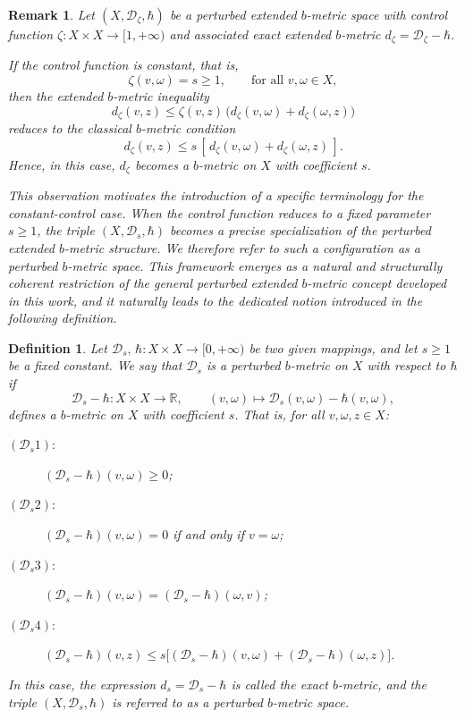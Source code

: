 \documentclass[sn-mathphys-num]{sn-jnl}%
\theoremstyle{thmstyleone}%
\theoremstyle{thmstyletwo}%
\newtheorem{remark}{Remark}%
\theoremstyle{thmstylethree}%
\newtheorem{definition}{Definition}
\numberwithin{equation}{section}
\begin{document}
\vspace{0.2cm}
\begin{remark}
Let $(X,\mathcal{D}_{\zeta},\hbar)$ be a perturbed extended $b$-metric space with 
control function $\zeta : X\times X \to [1,+\infty)$ and associated exact extended 
$b$-metric $d_{\zeta}=\mathcal{D}_{\zeta}-\hbar$.

If the control function is constant, that is,
\[
\zeta(v,\omega)=s\ge 1, \qquad \text{for all } v,\omega\in X,
\]
then the extended $b$-metric inequality
\[
d_{\zeta}(v,z)\le 
\zeta(v,z)\,\big(d_{\zeta}(v,\omega)+d_{\zeta}(\omega,z)\big)
\]
reduces to the classical $b$-metric condition
\[
d_{\zeta}(v,z)\le 
s\,[\,d_{\zeta}(v,\omega)+d_{\zeta}(\omega,z)\,].
\]
Hence, in this case, $d_{\zeta}$ becomes a $b$-metric on $X$ with coefficient $s$.

This observation motivates the introduction of a specific terminology for the 
constant-control case. When the control function reduces to a fixed parameter 
$s\ge 1$, the triple $(X,\mathcal{D}_{s},\hbar)$ becomes a precise specialization 
of the perturbed extended $b$-metric structure. We therefore refer to such a 
configuration as a \emph{perturbed $b$-metric space}. This framework emerges as a natural and structurally coherent restriction of the 
general perturbed extended $b$-metric concept developed in this work, and it 
naturally leads to the dedicated notion introduced in the following definition.
\end{remark}
\vspace{0.2cm}
\begin{definition}
Let $\mathcal{D}_{s},\, \hbar : X \times X \to [0,+\infty)$ be two given mappings, 
and let $s \ge 1$ be a fixed constant.  
We say that $\mathcal{D}_{s}$ is a \textit{perturbed $b$-metric} on $X$ with 
respect to $\hbar$ if 
\[
\mathcal{D}_{s} - \hbar : X \times X \to \mathbb{R},
\qquad
(v,\omega) \longmapsto \mathcal{D}_{s}(v,\omega) - \hbar(v,\omega),
\]
defines a $b$-metric on $X$ with coefficient $s$.  
That is, for all $v,\omega,z \in X$:

\begin{description}
    \item[$(\mathcal{D}_{s}1):$] $(\mathcal{D}_{s} - \hbar)(v,\omega) \ge 0$;
    \item[$(\mathcal{D}_{s}2):$] $(\mathcal{D}_{s} - \hbar)(v,\omega) = 0$ if and only if $v=\omega$;
    \item[$(\mathcal{D}_{s}3):$] $(\mathcal{D}_{s} - \hbar)(v,\omega)
           = (\mathcal{D}_{s} - \hbar)(\omega,v)$;
    \item[$(\mathcal{D}_{s}4):$] \(
    (\mathcal{D}_{s} - \hbar)(v,z)
    \le 
    s\Big[
      (\mathcal{D}_{s} - \hbar)(v,\omega)
      +
      (\mathcal{D}_{s} - \hbar)(\omega,z)
    \Big].
    \)
\end{description}

In this case, the expression $d_{s} = \mathcal{D}_{s} - \hbar$ is called the \textit{exact $b$-metric}, and the triple 
$(X,\mathcal{D}_{s},\hbar)$ is referred to as a 
\textit{perturbed $b$-metric space}.
\end{definition}
\end{document}
